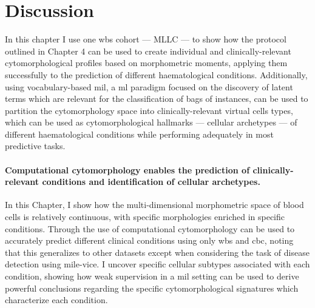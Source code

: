 \FloatBarrier

\section{Discussion}

In this chapter I use one \ac{wbs} cohort --- MLLC --- to show how the protocol outlined in Chapter 4 can be used to create individual and clinically-relevant cytomorphological profiles based on morphometric moments, applying them successfully to the prediction of different haematological conditions. Additionally, using vocabulary-based \ac{mil}, a \ac{ml} paradigm focused on the discovery of latent terms which are relevant for the classification of bags of instances, can be used to partition the cytomorphology space into clinically-relevant virtual cells types, which can be used as cytomorphological hallmarks --- cellular archetypes --- of different haematological conditions while performing adequately in most predictive tasks.

\paragraph{Computational cytomorphology enables the prediction of clinically-relevant conditions and identification of cellular archetypes.} In this Chapter, I show how the multi-dimensional morphometric space of blood cells is relatively continuous, with specific morphologies enriched in specific conditions. Through the use of computational cytomorphology can be used to accurately predict different clinical conditions using only \ac{wbs} and \ac{cbc}, noting that this generalizes to other datasets except when considering the task of disease detection using \ac{mile-vice}. I uncover specific cellular subtypes associated with each condition, showing how weak supervision in a \ac{mil} setting can be used to derive powerful conclusions regarding the specific cytomorphological signatures which characterize each condition. 

